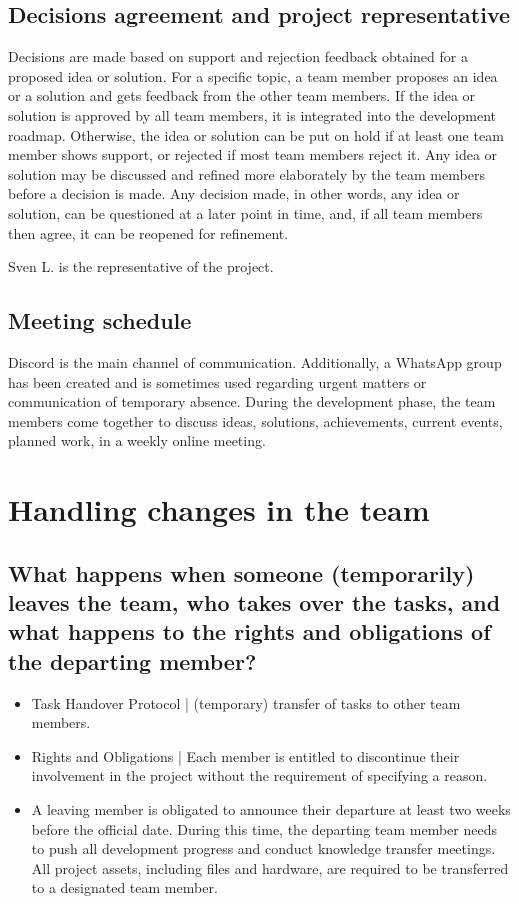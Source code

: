 \documentclass{article}
\begin{document}
\subsection{Decisions agreement and project representative}
Decisions are made based on support and rejection feedback obtained for a proposed idea or solution.
For a specific topic, a team member proposes an idea or a solution and gets feedback from the other team members.
If the idea or solution is approved by all team members, it is integrated into the development roadmap.
Otherwise, the idea or solution can be put on hold if at least one team member shows support, or rejected if most team members reject it.
Any idea or solution may be discussed and refined more elaborately by the team members before a decision is made.
Any decision made, in other words, any idea or solution, can be questioned at a later point in time, and, if all team members then agree, it can be reopened for refinement.

Sven L. is the representative of the project.

\subsection{Meeting schedule}
Discord is the main channel of communication.
Additionally, a WhatsApp group has been created and is sometimes used regarding urgent matters or communication of temporary absence.
During the development phase, the team members come together to discuss ideas, solutions, achievements, current events, planned work, in a weekly online meeting.

\section{Handling changes in the team}
\subsection{What happens when someone (temporarily) leaves the team, who takes over the tasks, and what happens to the rights and obligations of the departing member?}
\begin{itemize}
    \item Task Handover Protocol | (temporary) transfer of tasks to other team members.
    \item Rights and Obligations | Each member is entitled to discontinue their involvement in the project without the requirement of specifying a reason.
    \item A leaving member is obligated to announce their departure at least two weeks before the official date. During this time, the departing team member needs to push all development progress and conduct knowledge transfer meetings. All project assets, including files and hardware, are required to be transferred to a designated team member.
\end{itemize}
\end{document}
